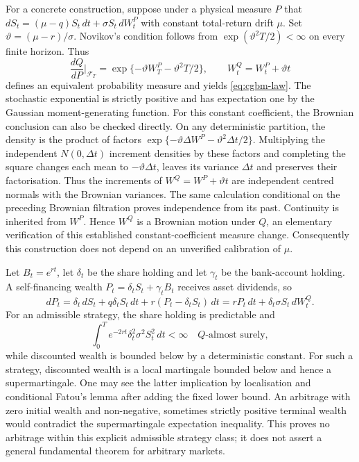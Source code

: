 \documentclass[11pt]{article}
\begin{document}
For a concrete construction, suppose under a physical measure $P$ that
$dS_t=(\mu-q)S_t\,dt+\sigma S_t\,dW_t^P$ with constant total-return drift
$\mu$. Set $\vartheta=(\mu-r)/\sigma$. Novikov's condition follows from
$\exp(\vartheta^2T/2)<\infty$ on every finite horizon. Thus
\begin{equation}
 \frac{dQ}{dP}\bigg|_{\mathcal F_T}
 =\exp\{-\vartheta W_T^P-\vartheta^2T/2\},\qquad
 W_t^Q=W_t^P+\vartheta t
 \label{eq:cgbm-rn}
\end{equation}
defines an equivalent probability measure and yields
\eqref{eq:cgbm-law}. The stochastic exponential is strictly positive
and has expectation one by the Gaussian moment-generating function.
For this constant coefficient, the Brownian conclusion can also be
checked directly. On any deterministic partition, the density is the
product of factors
$\exp\{-\vartheta\Delta W^P-\vartheta^2\Delta t/2\}$.
Multiplying the independent $N(0,\Delta t)$ increment densities by these
factors and completing the square changes each mean to
$-\vartheta\Delta t$, leaves its variance $\Delta t$ and preserves their
factorisation. Thus the increments of $W^Q=W^P+\vartheta t$ are independent
centred normals with the Brownian variances. The same calculation
conditional on the preceding Brownian filtration proves independence
from its past. Continuity is inherited from $W^P$. Hence $W^Q$ is a
Brownian motion under $Q$, an elementary verification of this established
constant-coefficient measure change.
Consequently this construction does not depend on an unverified
calibration of $\mu$.

Let $B_t=e^{rt}$, let $\delta_t$ be the share holding and let $\gamma_t$
be the bank-account holding. A self-financing wealth $P_t=\delta_tS_t+
\gamma_tB_t$ receives asset dividends, so
\begin{equation}
 dP_t=\delta_t\,dS_t+q\delta_tS_t\,dt+
 r(P_t-\delta_tS_t)\,dt
 =rP_t\,dt+\delta_t\sigma S_t\,dW_t^Q.
 \label{eq:cgbm-self-financing}
\end{equation}
For an admissible strategy, the share holding is predictable and
\begin{equation}
 \int_0^T e^{-2rt}\delta_t^2\sigma^2S_t^2\,dt<\infty
 \quad Q\text{-almost surely},\label{eq:cgbm-admissible-integrand}
\end{equation}
while discounted wealth is bounded below by a deterministic constant. For such a strategy, discounted
wealth is a local martingale bounded below and hence a supermartingale.
One may see the latter implication by localisation and conditional
Fatou's lemma after adding the fixed lower bound. An arbitrage with zero
initial wealth and non-negative, sometimes strictly positive terminal
wealth would contradict the supermartingale expectation inequality.
This proves no arbitrage within this explicit admissible strategy class;
it does not assert a general fundamental theorem for arbitrary markets.
\end{document}
